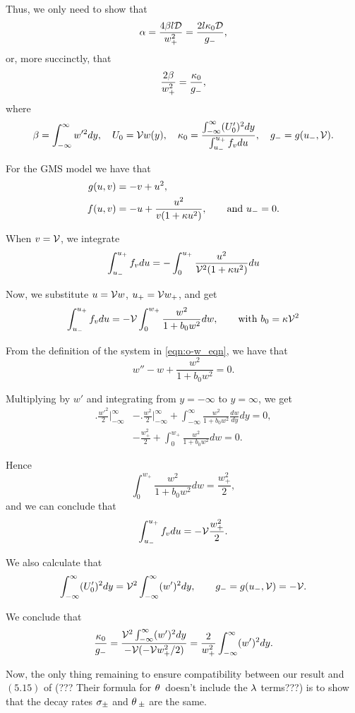 Thus, we only need to show that 
% 
\[
  \alpha = \frac{4\beta l\mathcal{D}}{w_+^2}= \frac{2l\kappa_0\mathcal{D}}{g_-},
\]
% 
or, more succinctly, that
% 
\[
  \frac{2\beta}{w_+^2}=\frac{\kappa_0}{g_-}, 
\]
% 
where
% 
\[
  \beta = \int_{-\infty}^{\infty}w'^2dy,\quad U_0=\mathcal{V} w(y),\quad \kappa_0 = \frac{\int_{-\infty}^{\infty}(U_0')^2dy}{\int_{u_-}^{u_+}f_vdu},\quad g_- = g(u_-,\mathcal{V}).
\]

For the GMS model we have that 
% 
\[
  \begin{split}
    g(u,v) &= -v+u^2,\\
	f(u,v) &= -u + \frac{u^2}{v(1+\kappa u^2)},\qquad\text{and }u_-=0.
  \end{split}
\]
% 

When $v=\mathcal{V}$, we integrate
% 
\[
  \int_{u_-}^{u_+}f_vdu = -\int_0^{u_+} \frac{u^2}{\mathcal{V}^2(1+\kappa u^2)}du 
\]
% 

Now, we substitute $u=\mathcal{V} w$, $u_+ = \mathcal{V} w_+$, and get
% 
\[
  \int_{u_-}^{u_+}f_vdu = -\mathcal{V}\int_0^{w_+} \frac{w^2}{1+b_0 w^2}dw,\qquad \text{with }b_0=\kappa\mathcal{V}^2 
\]
% 

From the definition of the system in \eqref{eqn:o-w_eqn}, we have that
% 
\[
  w'' - w + \frac{w^2}{1+b_0w^2}=0.
\]
% 

Multiplying by $w'$ and integrating from $y=-\infty$ to $y=\infty$, we get
% 
\[
\begin{split}
  \Big.\frac{w'^2}{2}\Big|_{-\infty}^{\infty} &- \Big.\frac{w^2}{2}\Big|_{-\infty}^{\infty} + \int_{-\infty}^{\infty} \frac{w^2}{1+b_0 w^2}\frac{dw}{dy}dy=0,\\
  &-\frac{w_+^2}{2} + \int_0^{w_+} \frac{w^2}{1+b_0 w^2}dw = 0.
\end{split}
\]
% 

Hence
% 
\[
  \int_0^{w_+} \frac{w^2}{1+b_0 w^2}dw = \frac{w_+^2}{2},
\]
% 
and we can conclude that
% 
\[
  \int_{u_-}^{u_+}f_vdu = -\mathcal{V}\frac{w_+^2}{2}.
\]
% 

We also calculate that
% 
\[
  \int_{-\infty}^{\infty}(U_0')^2dy = \mathcal{V}^2\int_{-\infty}^{\infty}(w')^2dy,\qquad g_- = g(u_-,\mathcal{V})=-\mathcal{V}.
\]
% 

We conclude that
% 
\[
  \frac{\kappa_0}{g_-} = \frac{\mathcal{V}^2\int_{-\infty}^{\infty}(w')^2dy}{-\mathcal{V}(-\mathcal{V} w_+^2/2)} = \frac{2}{w_+^2}\int_{-\infty}^{\infty}(w')^2dy.
\]

Now, the only thing remaining to ensure compatibility between our result and $(5.15)$ of \cite{kolokolnikov_stability_2005}(??? Their formula for $\theta\,$ doesn't include the $\lambda$ terms???) is to show that the decay rates $\sigma_{\pm}$ and $\theta\,_{\pm}$ are the same.

